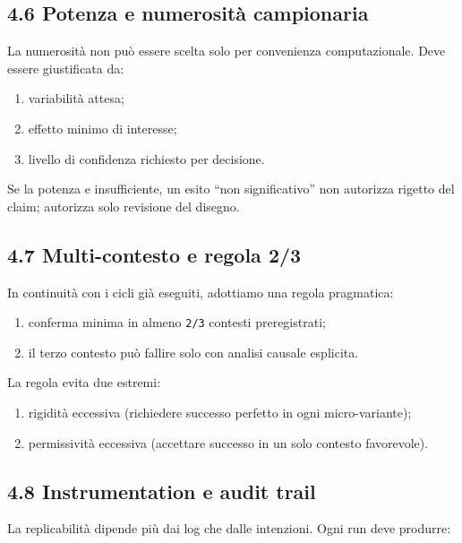 \subsection{4.6 Potenza e numerosità campionaria}

La numerosità non può essere scelta solo per convenienza computazionale. Deve essere giustificata da:

\begin{enumerate}
\def\labelenumi{\arabic{enumi}.}
\tightlist
\item
  variabilità attesa;
\item
  effetto minimo di interesse;
\item
  livello di confidenza richiesto per decisione.
\end{enumerate}

Se la potenza e insufficiente, un esito ``non significativo'' non autorizza rigetto del claim; autorizza solo revisione del disegno.

\subsection{4.7 Multi-contesto e regola 2/3}

In continuità con i cicli già eseguiti, adottiamo una regola pragmatica:

\begin{enumerate}
\def\labelenumi{\arabic{enumi}.}
\tightlist
\item
  conferma minima in almeno \texttt{2/3} contesti preregistrati;
\item
  il terzo contesto può fallire solo con analisi causale esplicita.
\end{enumerate}

La regola evita due estremi:

\begin{enumerate}
\def\labelenumi{\arabic{enumi}.}
\tightlist
\item
  rigidità eccessiva (richiedere successo perfetto in ogni micro-variante);
\item
  permissività eccessiva (accettare successo in un solo contesto favorevole).
\end{enumerate}

\subsection{4.8 Instrumentation e audit trail}

La replicabilità dipende più dai log che dalle intenzioni. Ogni run deve produrre:

